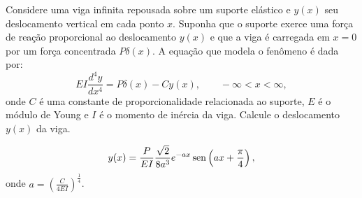 \begin{Exercise} Considere uma viga infinita repousada sobre um suporte elástico e $y(x)$ seu deslocamento vertical em cada ponto $x$. Suponha que o suporte exerce uma força de reação proporcional ao deslocamento $y(x)$ e que a viga é carregada em $x=0$ por um força concentrada $P\delta(x)$. A equação que modela o fenômeno é dada por:
$$
EI\frac{d^4 y}{dx^4}=P\delta(x)-Cy(x),\qquad -\infty<x<\infty,
$$
onde $C$ é uma constante de proporcionalidade relacionada ao suporte, $E$ é o módulo de Young e $I$ é o momento de inércia da viga. Calcule o deslocamento $y(x)$ da viga.
\end{Exercise}
\begin{Answer}
\begin{eqnarray*}
y(x)=\frac{P}{EI}\frac{\sqrt{2}}{8a^3}e^{-ax}\operatorname{sen}\left(ax+\frac{\pi}{4}\right),
\end{eqnarray*}
onde $a=\left(\frac{C}{4EI}\right)^{\frac{1}{4}}$.
\end{Answer}


%